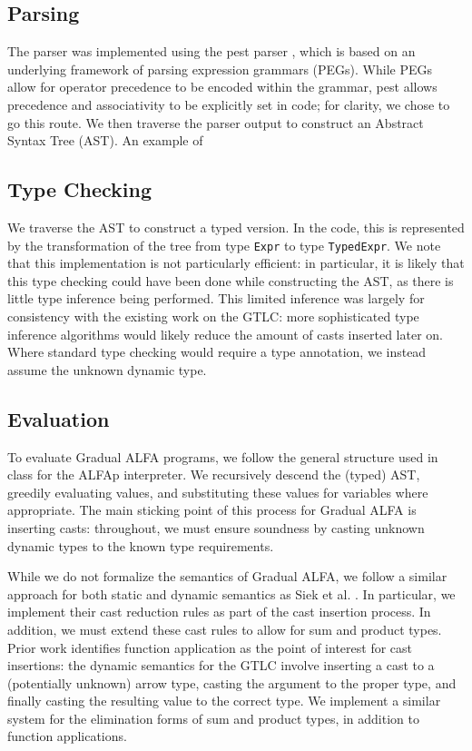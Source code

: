 \documentclass [11pt]{article}
\begin{document}
\subsection{Parsing}
The parser was implemented using the pest parser \cite{Pest}, which is based on an underlying framework of parsing expression grammars (PEGs). While PEGs allow for operator precedence to be encoded within the grammar, pest allows precedence and associativity to be explicitly set in code; for clarity, we chose to go this route. We then traverse the parser output to construct an Abstract Syntax Tree (AST). An example of 

\subsection{Type Checking}
We traverse the AST to construct a typed version. In the code, this is represented by the transformation of the tree from type \verb|Expr| to type \verb|TypedExpr|. We note that this implementation is not particularly efficient: in particular, it is likely that this type checking could have been done while constructing the AST, as there is little type inference being performed. This limited inference was largely for consistency with the existing work on the GTLC: more sophisticated type inference algorithms would likely reduce the amount of casts inserted later on. Where standard type checking would require a type annotation, we instead assume the unknown dynamic type.

\subsection{Evaluation}
To evaluate Gradual ALFA programs, we follow the general structure used in class for the ALFAp interpreter. We recursively descend the (typed) AST, greedily evaluating values, and substituting these values for variables where appropriate. The main sticking point of this process for Gradual ALFA is inserting casts: throughout, we must ensure soundness by casting unknown dynamic types to the known type requirements.


While we do not formalize the semantics of Gradual ALFA, we follow a similar approach for both static and dynamic semantics as Siek et al. \cite{siek2015refined}. In particular, we implement their cast reduction rules  as part of the cast insertion process. In addition, we must extend these cast rules to allow for sum and product types. Prior work identifies function application as the point of interest for cast insertions: the dynamic semantics for the GTLC involve inserting a cast to a (potentially unknown) arrow type, casting the argument to the proper type, and finally casting the resulting value to the correct type. We implement a similar system for the elimination forms of sum and product types, in addition to function applications.
\end{document}
